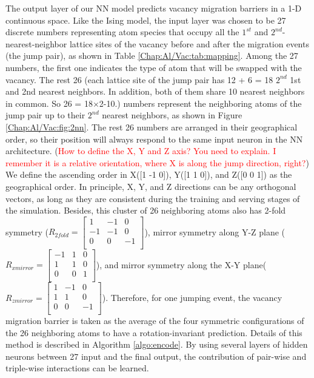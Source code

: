 The output layer of our \ac{NN} model predicts vacancy migration barriers in a 1-D continuous space. Like the Ising model, the input layer was chosen to be 27 discrete numbers representing atom species that occupy all the $\text{1}^{st}$ and $\text{2}^{nd}$-nearest-neighbor lattice sites of the vacancy before and after the migration events (the jump pair), as shown in Table \ref{Chap:Al/Vac:tab:mapping}. Among the 27 numbers, the first one indicates the type of atom that will be swapped with the vacancy. The rest 26 (each lattice site of the jump pair has 12 + 6 = 18 $\text{2}^{nd}$ 1st and 2nd nearest neighbors. In addition, both of them share 10  nearest neighbors in common. So 26 = 18$\times$2-10.) numbers represent the neighboring atoms of the jump pair up to their $\text{2}^{nd}$ nearest neighbors, as shown in Figure \ref{Chap:Al/Vac:fig:2nn}. The rest 26 numbers are arranged in their geographical order, so their position will always respond to the same input neuron in the \ac{NN} architecture. (\textcolor{red}{How to define the X, Y and Z axis? You need to explain. I remember it is a relative orientation, where X is along the jump direction, right?}) We define the ascending order in X([1 -1 0]), Y([1 1 0]), and Z([0 0 1]) as the geographical order. In principle, X, Y, and Z directions can be any orthogonal vectors, as long as they are consistent during the training and serving stages of the simulation. Besides, this cluster of 26 neighboring atoms also has 2-fold symmetry  ($R_{2 fold} = \begin{bmatrix} 1 & -1 & 0 \\-1 & -1 & 0 \\0 & 0 & -1 \\\end{bmatrix}$), mirror symmetry along Y-Z plane ($R_{x mirror} = \begin{bmatrix} -1 & 1 & 0 \\1 & 1 & 0 \\0 & 0 & 1 \\\end{bmatrix}$), and mirror symmetry along the X-Y plane($R_{z mirror} = \begin{bmatrix} 1 & -1 & 0 \\1 & 1 & 0 \\0 & 0 & -1 \\\end{bmatrix}$). Therefore, for one jumping event, the vacancy migration barrier is taken as the average of the four symmetric configurations of the 26 neighboring atoms to have a rotation-invariant prediction. Details of this method is described in Algorithm \ref{algo:encode}. By using several layers of hidden neurons between 27 input and the final output, the contribution of pair-wise and triple-wise interactions can be learned.


